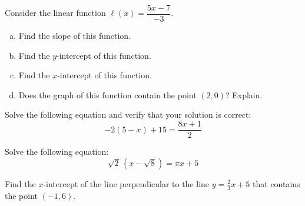 \documentclass[11pt,letterpaper]{article}
\begin{document}

 Consider the linear function $\ell(x)= \dfrac{5x - 7}{-3}$. 
	\begin{enumerate}[(a)]
	\item Find the slope of this function.
	\item Find the $y$-intercept of this function.
	\item Find the $x$-intercept of this function.
	\item Does the graph of this function contain the point $(2, 0)$? Explain. 
	\end{enumerate}



\newpage



 Solve the following equation and verify that your solution is correct:
	\[
	-2(5 - x) + 15= \dfrac{8x + 1}{2}
	\]



\newpage



 Solve the following equation:
	\[
	\sqrt{2}\, (x - \sqrt{8})= \pi x + 5
	\] 



\newpage



 Find the $x$-intercept of the line perpendicular to the line $y= \frac{2}{3}x + 5$ that contains the point $(-1, 6)$. 
\end{document}
